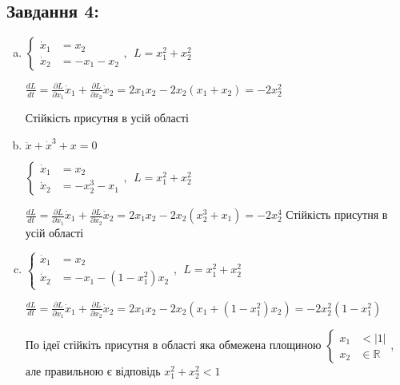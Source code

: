 \subsection{Завдання 4:}



\begin{enumerate}[a)]
    \item {
        $\left\{\begin{aligned}
            \dot{x}_1 &= x_2 \\
            \dot{x}_2 &= -x_1-x_2
        \end{aligned}\right., \ \ L = x_1^2 + x_2^2$

        $\frac{dL}{dt} = \frac{\partial L}{\partial x_1}\dot{x}_1 + 
        \frac{\partial L}{\partial x_2} \dot{x}_2 = 2x_1x_2 - 2x_2(x_1 + x_2) = -2x_2^2$

        Стійкість присутня в усій області
    }

    \item {
        $\ddot{x} + \dot{x}^3 + x = 0$

        $\left\{\begin{aligned}
            \dot{x}_1 &= x_2 \\
            \dot{x}_2 &= -x_2^3  - x_1
        \end{aligned}\right., \ \ L = x_1^2 + x_2^2$

        $\frac{dL}{dt} = \frac{\partial L}{\partial x_1}\dot{x}_1 + 
        \frac{\partial L}{\partial x_2} \dot{x}_2 = 2x_1x_2 - 2x_2(x_2^3 + x_1) = -2x_2^4$
        Стійкість присутня в усій області
    }

    \item {
        $\left\{\begin{aligned}
            \dot{x}_1 &= x_2 \\
            \dot{x}_2 &= -x_1 -(1-x_1^2)x_2
        \end{aligned}\right.,  \ \ L = x_1^2 + x_2^2$

        $\frac{dL}{dt} = \frac{\partial L}{\partial x_1}\dot{x}_1 + 
        \frac{\partial L}{\partial x_2} \dot{x}_2 = 2x_1x_2 - 2x_2(x_1 + (1-x_1^2)x_2) = 
        -2x_2^2(1-x_1^2)$

        По ідеї стійкіть присутня в області яка обмежена площиною 
        $\left\{\begin{aligned}
            x_1 &< |1|\\
            x_2 &\in \mathbb{R} 
        \end{aligned}\right.$, але 
        правильною є відповідь $x_1^2 + x_2^2 < 1$

}
\end{enumerate}
